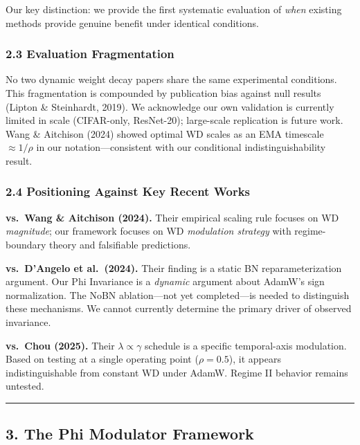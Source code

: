 \documentclass[
]{article}
\begin{document}
Our key distinction: we provide the first systematic evaluation of
\emph{when} existing methods provide genuine benefit under identical
conditions.

\hypertarget{evaluation-fragmentation}{%
\subsubsection{2.3 Evaluation
Fragmentation}\label{evaluation-fragmentation}}

No two dynamic weight decay papers share the same experimental
conditions. This fragmentation is compounded by publication bias against
null results (Lipton \& Steinhardt, 2019). We acknowledge our own
validation is currently limited in scale (CIFAR-only, ResNet-20);
large-scale replication is future work. Wang \& Aitchison (2024) showed
optimal WD scales as an EMA timescale \(\approx 1/\rho\) in our
notation---consistent with our conditional indistinguishability result.

\hypertarget{positioning-against-key-recent-works}{%
\subsubsection{2.4 Positioning Against Key Recent
Works}\label{positioning-against-key-recent-works}}

\textbf{vs.~Wang \& Aitchison (2024).} Their empirical scaling rule
focuses on WD \emph{magnitude}; our framework focuses on WD
\emph{modulation strategy} with regime-boundary theory and falsifiable
predictions.

\textbf{vs.~D'Angelo et al.~(2024).} Their finding is a static BN
reparameterization argument. Our Phi Invariance is a \emph{dynamic}
argument about AdamW's sign normalization. The NoBN ablation---not yet
completed---is needed to distinguish these mechanisms. We cannot
currently determine the primary driver of observed invariance.

\textbf{vs.~Chou (2025).} Their \(\lambda \propto \gamma\) schedule is a
specific temporal-axis modulation. Based on testing at a single
operating point (\(\rho = 0.5\)), it appears indistinguishable from
constant WD under AdamW. Regime II behavior remains untested.

\begin{center}\rule{0.5\linewidth}{0.5pt}\end{center}

\hypertarget{the-phi-modulator-framework}{%
\subsection{3. The Phi Modulator
Framework}\label{the-phi-modulator-framework}}
\end{document}
